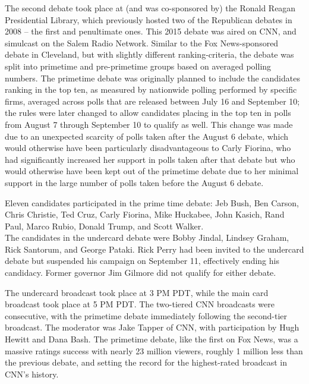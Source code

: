 The second debate took place at (and was co-sponsored by) the Ronald
Reagan Presidential Library, which previously hosted two of the
Republican debates in 2008 -- the first and penultimate ones. This 2015
debate was aired on CNN, and simulcast on the Salem Radio Network.
Similar to the Fox News-sponsored debate in Cleveland, but with slightly
different ranking-criteria, the debate was split into primetime and
pre-primetime groups based on averaged polling numbers. The primetime
debate was originally planned to include the candidates ranking in the
top ten, as measured by nationwide polling performed by specific firms,
averaged across polls that are released between July 16 and September
10; the rules were later changed to allow candidates placing in the top
ten in polls from August 7 through September 10 to qualify as well. This
change was made due to an unexpected scarcity of polls taken after the
August 6 debate, which would otherwise have been particularly
disadvantageous to Carly Fiorina, who had significantly increased her
support in polls taken after that debate but who would otherwise have
been kept out of the primetime debate due to her minimal support in the
large number of polls taken before the August 6 debate.

Eleven candidates participated in the prime time debate: Jeb Bush, Ben
Carson, Chris Christie, Ted Cruz, Carly Fiorina, Mike Huckabee, John
Kasich, Rand Paul, Marco Rubio, Donald Trump, and Scott Walker.\\
The candidates in the undercard debate were Bobby Jindal, Lindsey
Graham, Rick Santorum, and George Pataki. Rick Perry had been invited to
the undercard debate but suspended his campaign on September 11,
effectively ending his candidacy. Former governor Jim Gilmore did not
qualify for either debate.

The undercard broadcast took place at 3 PM PDT, while the main card
broadcast took place at 5 PM PDT. The two-tiered CNN broadcasts were
consecutive, with the primetime debate immediately following the
second-tier broadcast. The moderator was Jake Tapper of CNN, with
participation by Hugh Hewitt and Dana Bash. The primetime debate, like
the first on Fox News, was a massive ratings success with nearly 23
million viewers, roughly 1 million less than the previous debate, and
setting the record for the highest-rated broadcast in CNN's history.


